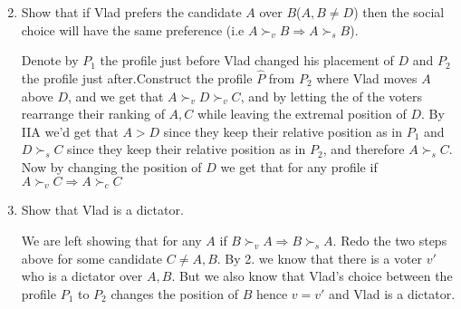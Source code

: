 \documentclass[a4paper,11pt]{exam}
\begin{document}
\begin{questions}
\begin{enumerate}\setcounter{enumi}{1}
	\item Show that if Vlad prefers the candidate $A$ over $B$($A,B\neq D$) then the social choice will have the same preference (i.e $A\succ_v B\Rightarrow A\succ_s B$).
	\begin{solution}
		Denote by $P_1$ the profile just before Vlad changed his placement of $D$ and $P_2$ the profile just after.Construct the profile $\widehat{P}$ from $P_2$ where Vlad moves $A$ above $D$, and we get that $A\succ_vD\succ_vC$, and by letting the of the voters rearrange their ranking of $A,C$ while leaving the extremal position of $D$.  By IIA we'd get that $A>D$ since they keep their relative position as in $P_1$ and $D\succ_sC$  since they keep their relative position as in $P_2$, and therefore $A\succ_sC$. Now by changing the position of $D	$ we get that for any profile if $A\succ_v C\Rightarrow A\succ_c C$ 
	\end{solution}
	\item Show that Vlad is a dictator.
	\begin{solution}
		We are left showing that for any $A$ if $B\succ_vA\Rightarrow B\succ_sA$. Redo the two steps above for some candidate $C\neq A,B$. By 2. we know that there is a voter $v'$ who is a dictator over $A,B$. But we also know that Vlad's choice between the profile $P_1$ to $P_2$ changes the position of $B$ hence $v=v' $ and Vlad is a dictator.
	\end{solution} 
\end{enumerate}



\end{questions}
\end{document}

